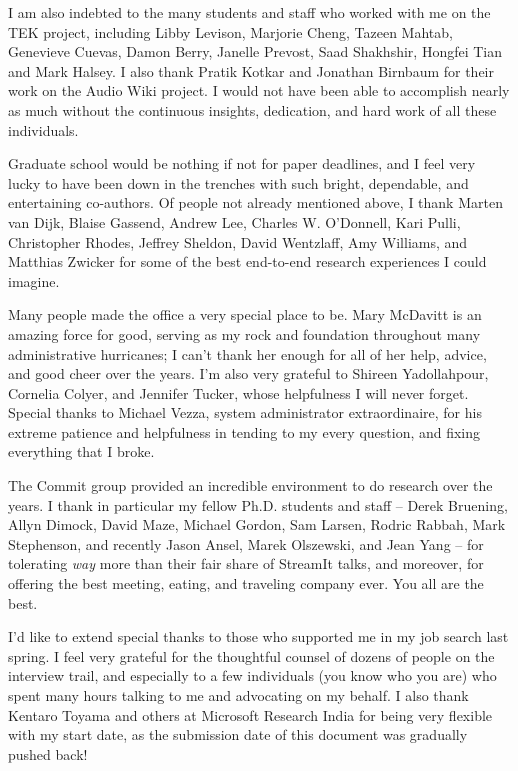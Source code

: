 I am also indebted to the many students and staff who worked with me
on the TEK project, including Libby Levison, Marjorie Cheng, Tazeen
Mahtab, Genevieve Cuevas, Damon Berry, Janelle Prevost, Saad
Shakhshir, Hongfei Tian and Mark Halsey.  I also thank Pratik Kotkar
and Jonathan Birnbaum for their work on the Audio Wiki project.  I
would not have been able to accomplish nearly as much without the
continuous insights, dedication, and hard work of all these
individuals.

%

Graduate school would be nothing if not for paper deadlines, and I
feel very lucky to have been down in the trenches with such bright,
dependable, and entertaining co-authors.  Of people not already
mentioned above, I thank Marten van Dijk, Blaise Gassend, Andrew
Lee, Charles W. O'Donnell, Kari Pulli, Christopher Rhodes, Jeffrey
Sheldon, David Wentzlaff, Amy Williams, and Matthias Zwicker for
some of the best end-to-end research experiences I could imagine.

Many people made the office a very special place to be.  Mary
McDavitt is an amazing force for good, serving as my rock and
foundation throughout many administrative hurricanes; I can't thank
her enough for all of her help, advice, and good cheer over the
years.  I'm also very grateful to Shireen Yadollahpour, Cornelia
Colyer, and Jennifer Tucker, whose helpfulness I will never forget.
Special thanks to Michael Vezza, system administrator
extraordinaire, for his extreme patience and helpfulness in tending
to my every question, and fixing everything that I broke.

The Commit group provided an incredible environment to do research
over the years.  I thank in particular my fellow Ph.D. students and
staff -- Derek Bruening, Allyn Dimock, David Maze, Michael Gordon,
Sam Larsen, Rodric Rabbah, Mark Stephenson, and recently Jason
Ansel, Marek Olszewski, and Jean Yang -- for tolerating {\it way}
more than their fair share of StreamIt talks, and moreover, for
offering the best meeting, eating, and traveling company ever.  You
all are the best.

I'd like to extend special thanks to those who supported me in my
job search last spring.  I feel very grateful for the thoughtful
counsel of dozens of people on the interview trail, and especially
to a few individuals (you know who you are) who spent many hours
talking to me and advocating on my behalf.  
I also thank Kentaro Toyama and others at Microsoft Research India
for being very flexible with my start date, as the submission date
of this document was gradually pushed back!

